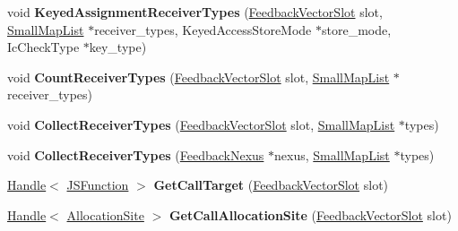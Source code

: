 \begin{DoxyCompactItemize}
\item 
void {\bfseries Keyed\+Assignment\+Receiver\+Types} (\hyperlink{classv8_1_1internal_1_1_feedback_vector_slot}{Feedback\+Vector\+Slot} slot, \hyperlink{classv8_1_1internal_1_1_small_map_list}{Small\+Map\+List} $\ast$receiver\+\_\+types, Keyed\+Access\+Store\+Mode $\ast$store\+\_\+mode, Ic\+Check\+Type $\ast$key\+\_\+type)\hypertarget{classv8_1_1internal_1_1_type_feedback_oracle_a009701e50fb50c0ea13ac2ce44970b08}{}\label{classv8_1_1internal_1_1_type_feedback_oracle_a009701e50fb50c0ea13ac2ce44970b08}

\item 
void {\bfseries Count\+Receiver\+Types} (\hyperlink{classv8_1_1internal_1_1_feedback_vector_slot}{Feedback\+Vector\+Slot} slot, \hyperlink{classv8_1_1internal_1_1_small_map_list}{Small\+Map\+List} $\ast$receiver\+\_\+types)\hypertarget{classv8_1_1internal_1_1_type_feedback_oracle_a5cb018bf53f6e86a82edcad84ba6f56c}{}\label{classv8_1_1internal_1_1_type_feedback_oracle_a5cb018bf53f6e86a82edcad84ba6f56c}

\item 
void {\bfseries Collect\+Receiver\+Types} (\hyperlink{classv8_1_1internal_1_1_feedback_vector_slot}{Feedback\+Vector\+Slot} slot, \hyperlink{classv8_1_1internal_1_1_small_map_list}{Small\+Map\+List} $\ast$types)\hypertarget{classv8_1_1internal_1_1_type_feedback_oracle_a74f6df941eae84edec74c9c10ee5f3a9}{}\label{classv8_1_1internal_1_1_type_feedback_oracle_a74f6df941eae84edec74c9c10ee5f3a9}

\item 
void {\bfseries Collect\+Receiver\+Types} (\hyperlink{classv8_1_1internal_1_1_feedback_nexus}{Feedback\+Nexus} $\ast$nexus, \hyperlink{classv8_1_1internal_1_1_small_map_list}{Small\+Map\+List} $\ast$types)\hypertarget{classv8_1_1internal_1_1_type_feedback_oracle_afa15186311902fc249f3d4f7a75ed290}{}\label{classv8_1_1internal_1_1_type_feedback_oracle_afa15186311902fc249f3d4f7a75ed290}

\item 
\hyperlink{classv8_1_1internal_1_1_handle}{Handle}$<$ \hyperlink{classv8_1_1internal_1_1_j_s_function}{J\+S\+Function} $>$ {\bfseries Get\+Call\+Target} (\hyperlink{classv8_1_1internal_1_1_feedback_vector_slot}{Feedback\+Vector\+Slot} slot)\hypertarget{classv8_1_1internal_1_1_type_feedback_oracle_ace773e0cd5251ea600c38ed059f9603c}{}\label{classv8_1_1internal_1_1_type_feedback_oracle_ace773e0cd5251ea600c38ed059f9603c}

\item 
\hyperlink{classv8_1_1internal_1_1_handle}{Handle}$<$ \hyperlink{classv8_1_1internal_1_1_allocation_site}{Allocation\+Site} $>$ {\bfseries Get\+Call\+Allocation\+Site} (\hyperlink{classv8_1_1internal_1_1_feedback_vector_slot}{Feedback\+Vector\+Slot} slot)\hypertarget{classv8_1_1internal_1_1_type_feedback_oracle_a4b5f9db3cf95da0f2d435c5f0e55a0c8}{}\label{classv8_1_1internal_1_1_type_feedback_oracle_a4b5f9db3cf95da0f2d435c5f0e55a0c8}


\end{DoxyCompactItemize}

